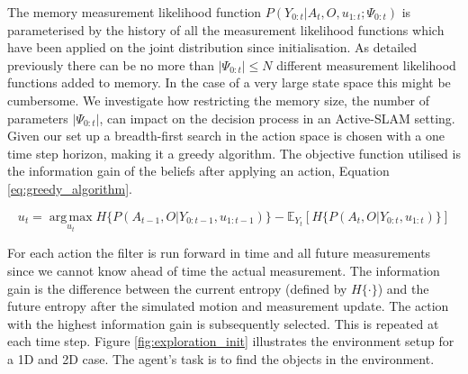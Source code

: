 The memory measurement likelihood function $P(Y_{0:t}|A_t,O,u_{1:t};\Psi_{0:t})$ is parameterised by the 
history of all the measurement likelihood functions which have been applied on the joint 
distribution since initialisation. As detailed previously there can be no more than $|\Psi_{0:t}| \leq N$ different measurement likelihood functions added to 
memory. In the case of a very large state space this might be cumbersome. We investigate how restricting the memory size, the number 
of parameters $|\Psi_{0:t}|$, can impact on the decision process in an Active-SLAM setting. Given our set up a breadth-first search in the action 
space is chosen with a one time step horizon, making it a greedy algorithm. The objective function utilised is the information
gain of the beliefs after applying an action, Equation \ref{eq:greedy_algorithm}.

\begin{equation}\label{eq:greedy_algorithm}
 u_{t} = \operatorname*{arg\,max}_{u_t} H\{P(A_{t-1},O|Y_{0:t-1},u_{1:t-1})\} - \mathbb{E}_{Y_t}\left[H\{P(A_{t},O|Y_{0:t},u_{1:t})\}\right]
\end{equation}

For each action the filter is run forward in time and all future measurements since we cannot know ahead of time the actual 
measurement. The information gain is the difference between the current entropy (defined 
by $H\{\cdot\}$) and the future entropy after the simulated motion and measurement update. The action with the highest information gain 
is subsequently selected. This is repeated at each time step. Figure \ref{fig:exploration_init} illustrates the environment setup for 
a 1D and 2D case. The agent's task is to find the objects in the environment.


